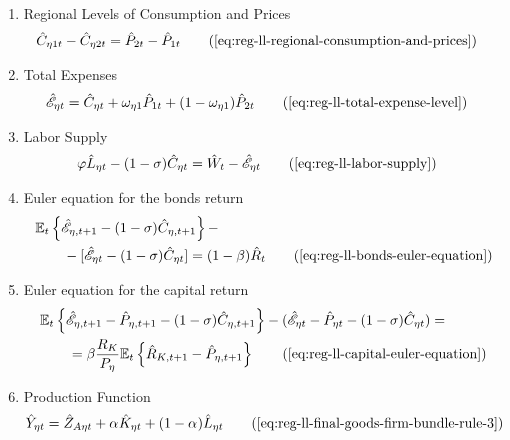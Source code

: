 \documentclass[../thesis.tex]{subfiles}
\begin{document}
{\begin{itemize}
\begin{enumerate}
		\item Regional Levels of Consumption and Prices
		\begin{align}
			\hat{C}_{\eta 1 t} - \hat{C}_{\eta 2 t} &= \hat{P}_{2 t} - \hat{P}_{1 t} \tag{\ref{eq:reg-ll-regional-consumption-and-prices}}
		\end{align}
		
		\item Total Expenses
		\begin{align}
			\hat{\mathscr{E}}_{\eta t} &= \hat{C}_{\eta t} + \omega_{\eta 1} \hat{P}_{1 t} + (1 -\omega_{\eta 1}) \hat{P}_{2 t} \tag{\ref{eq:reg-ll-total-expense-level}}
		\end{align}

		\item Labor Supply
		\begin{alignat}{2}
			\varphi \hat{L}_{\eta t} - (1 -\sigma) \hat{C}_{\eta t} &= \hat{W}_t - \hat{ \mathscr{E} }_{\eta t} \tag{\ref{eq:reg-ll-labor-supply}}
		\end{alignat}
		
		\item Euler equation for the bonds return
		\begin{alignat}{2}
			& \E \left\{ \hat{\mathscr{E}}_{\eta, t+1} - (1 -\sigma)\hat{C}_{\eta, t+1} \right\} - \nonumber \\ & \qquad - [\hat{\mathscr{E}}_{\eta t} - (1 -\sigma)\hat{C}_{\eta t}] = (1 -\beta) \hat{R}_{t} \tag{\ref{eq:reg-ll-bonds-euler-equation}}
		\end{alignat}
		
		\item Euler equation for the capital return
		\begin{alignat}{2}
			& \E \left\{ \hat{\mathscr{E}}_{\eta, t+1} - \hat{P}_{\eta, t+1}  - (1 -\sigma) \hat{C}_{\eta, t+1} \right\} - (\hat{\mathscr{E}}_{\eta t} - \hat{P}_{\eta t} - (1 -\sigma) \hat{C}_{\eta t}) = \nonumber \\
			& \qquad = \beta \frac{R_{K}}{P_{\eta}} \mathbb{E}_t \left\{ \hat{R}_{K, t+1} - \hat{P}_{\eta, t+1} \right\} \tag{\ref{eq:reg-ll-capital-euler-equation}}
		\end{alignat}
		
		\item Production Function
		\begin{align}
			\hat{Y}_{\eta t} &= \hat{Z}_{A\eta t} + {\alpha_{}} \hat{K}_{\eta t} + (1-{\alpha_{}}) \hat{L}_{\eta t} \tag{\ref{eq:reg-ll-final-goods-firm-bundle-rule-3}}
		\end{align}
		

\end{enumerate}
\end{itemize}}
\end{document}
